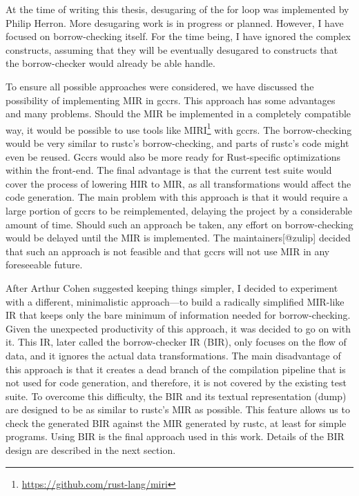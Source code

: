 \documentclass[
  11pt,
]{report}
\renewenvironment{quote}{\begin{myquote}}{\end{myquote}}
\DeclareRobustCommand{\href}[2]{#2\footnote{\url{#1}}}
\begin{document}
\begin{quote}
At the time of writing this thesis, desugaring of the for loop was
implemented by Philip Herron. More desugaring work is in progress or
planned. However, I have focused on borrow-checking itself. For the time
being, I have ignored the complex constructs, assuming that they will be
eventually desugared to constructs that the borrow-checker would already
be able handle.
\end{quote}

To ensure all possible approaches were considered, we have discussed the
possibility of implementing MIR in gccrs. This approach has some
advantages and many problems. Should the MIR be implemented in a
completely compatible way, it would be possible to use tools like
\href{https://github.com/rust-lang/miri}{MIRI} with gccrs. The
borrow-checking would be very similar to rustc's borrow-checking, and
parts of rustc's code might even be reused. Gccrs would also be more
ready for Rust-specific optimizations within the front-end. The final
advantage is that the current test suite would cover the process of
lowering HIR to MIR, as all transformations would affect the code
generation. The main problem with this approach is that it would require
a large portion of gccrs to be reimplemented, delaying the project by a
considerable amount of time. Should such an approach be taken, any
effort on borrow-checking would be delayed until the MIR is implemented.
The maintainers{[}@zulip{]} decided that such an approach is not
feasible and that gccrs will not use MIR in any foreseeable future.

After Arthur Cohen suggested keeping things simpler, I decided to
experiment with a different, minimalistic approach---to build a
radically simplified MIR-like IR that keeps only the bare minimum of
information needed for borrow-checking. Given the unexpected
productivity of this approach, it was decided to go on with it. This IR,
later called the borrow-checker IR (BIR), only focuses on the flow of
data, and it ignores the actual data transformations. The main
disadvantage of this approach is that it creates a dead branch of the
compilation pipeline that is not used for code generation, and
therefore, it is not covered by the existing test suite. To overcome
this difficulty, the BIR and its textual representation (dump) are
designed to be as similar to rustc's MIR as possible. This feature
allows us to check the generated BIR against the MIR generated by rustc,
at least for simple programs. Using BIR is the final approach used in
this work. Details of the BIR design are described in the next section.
\end{document}
